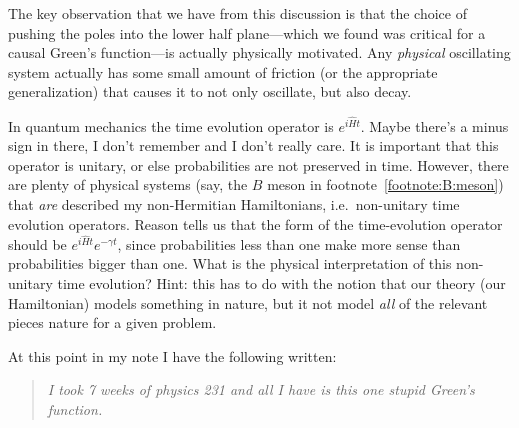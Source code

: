  The key observation that we have from this discussion is that the choice of pushing the poles into the lower half plane---which we found was critical for a causal Green's function---is actually physically motivated. Any \emph{physical} oscillating system actually has some small amount of friction (or the appropriate generalization) that causes it to not only oscillate, but also decay. 
 \begin{exercise}
 In quantum mechanics the time evolution operator is $e^{i\hat H t}$. Maybe there's a minus sign in there, I don't remember and I don't really care. It is important that this operator is unitary, or else probabilities are not preserved in time. However, there are plenty of physical systems (say, the $B$ meson in footnote~\ref{footnote:B:meson}) that \emph{are} described my non-Hermitian Hamiltonians, i.e.~non-unitary time evolution operators. Reason tells us that the form of the time-evolution operator should be $e^{i\hat H t}e^{-\gamma t}$, since probabilities less than one make more sense than probabilities bigger than one. What is the physical interpretation of this non-unitary time evolution? Hint: this has to do with the notion that our theory (our Hamiltonian) models something in nature, but it not model \emph{all} of the relevant pieces nature for a given problem.
 \end{exercise}
 At this point in my note I have the following written:
 \begin{quote}
 \emph{I took 7 weeks of physics 231 and all I have is this one stupid Green's function.}
 \end{quote}
 
 
 